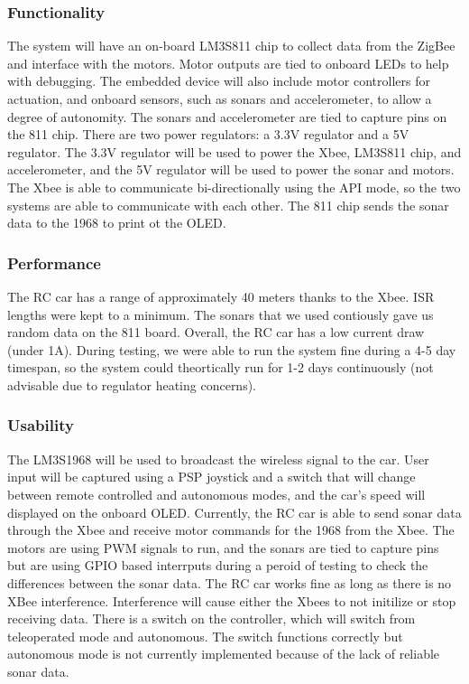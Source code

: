 \documentclass[twoside]{article}
\begin{document}
\subsubsection{Functionality}
The system will have an on-board LM3S811 chip to collect data from the ZigBee and interface with the motors. Motor outputs are tied to onboard LEDs to help with debugging. The embedded device will also include motor controllers for actuation, and onboard sensors, such as sonars and accelerometer, to allow a degree of autonomity. The sonars and accelerometer are tied to capture pins on the 811 chip. There are two power regulators: a 3.3V regulator and a 5V regulator. The 3.3V regulator will be used to power the Xbee, LM3S811 chip, and accelerometer, and the 5V regulator will be used to power the sonar and motors. The Xbee is able to communicate bi-directionally using the API mode, so the two systems are able to communicate with each other. The 811 chip sends the sonar data to the 1968 to print ot the OLED.
\subsubsection{Performance}
The RC car has a range of approximately 40 meters thanks to the Xbee. ISR lengths were kept to a minimum. The sonars that we used contiously gave us random data on the 811 board. Overall, the RC car has a low current draw (under 1A). During testing, we were able to run the system fine during a 4-5 day timespan, so the system could theortically run for 1-2 days continuously (not advisable due to regulator heating concerns).
\subsubsection{Usability}
The LM3S1968 will be used to broadcast the wireless signal to the car. User input will be captured using a PSP joystick and a switch that will change between remote controlled and autonomous modes, and the car's speed will displayed on the onboard OLED. Currently, the RC car is able to send sonar data through the Xbee and receive motor commands for the 1968 from the Xbee. The motors are using PWM signals to run, and the sonars are tied to capture pins but are using GPIO based interrputs during a peroid of testing to check the differences between the sonar data. The RC car works fine as long as there is no XBee interference. Interference will cause either the Xbees to not initilize or stop receiving data. There is a switch on the controller, which will switch from teleoperated mode and autonomous. The switch functions correctly but autonomous mode is not currently implemented because of the lack of reliable sonar data.
\end{document}
